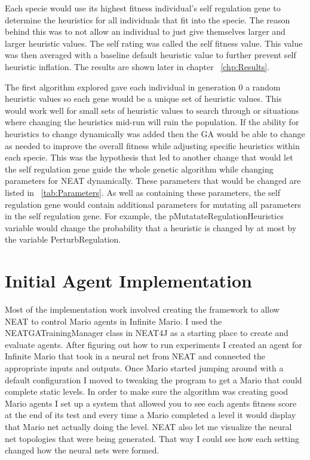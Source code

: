 \documentclass[12pt]{ucthesis} \newif\ifpdf \ifx\pdfoutput\undefined
\begin{document}
Each specie would use its highest fitness individual’s self regulation gene to
determine the heuristics for all individuals that fit into the specie. The
reason behind this was to not allow an individual to just give themselves larger
and larger heuristic values. The self rating was called the self fitness value.
This value was then averaged with a baseline default heuristic value to further
prevent self heuristic inflation. The results are shown later in chapter
~\ref{chp:Results}.

The first algorithm explored gave each individual in generation 0 a random
heuristic values so each gene would be a unique set of heuristic values. This
would work well for small sets of heuristic values to search through or
situations where changing the heuristics mid-run will ruin the population. If the ability
for heuristics to change dynamically was added then the GA would be able to
change as needed to improve the overall fitness while adjusting specific
heuristics within each specie. This was the hypothesis that led to another
change that would let the self regulation gene guide the whole genetic algorithm
while changing parameters for NEAT dynamically. These parameters that would be
changed are listed in ~\ref{tab:Parameters}. As well as containing these
parameters, the self regulation gene would contain additional parameters for
mutating all parameters in the self regulation gene.
For example, the pMutatateRegulationHeuristics variable would change the
probability that a heuristic is changed by at most by the variable PerturbRegulation.


\section{Initial Agent Implementation}

Most of the implementation work involved creating the framework to allow NEAT to
control Mario agents in Infinite Mario. I used the NEATGATrainingManager class
in NEAT4J as a starting place to create and evaluate agents.
After figuring out how to run experiments I created an agent for
Infinite Mario that took in a neural net from NEAT and connected the appropriate
inputs and outputs. Once Mario started jumping around with a default configuration I moved
to tweaking the program to get a Mario that could complete static levels.
In order to make sure the algorithm was creating good Mario agents I set up a
system that allowed you to see each agents fitness score at the end of its test
and every time a Mario completed a level it would display that Mario net
actually doing the level. NEAT also let me visualize the neural net topologies
that were being generated. That way I could see how each setting changed how the
neural nets were formed.
 
\end{document}
